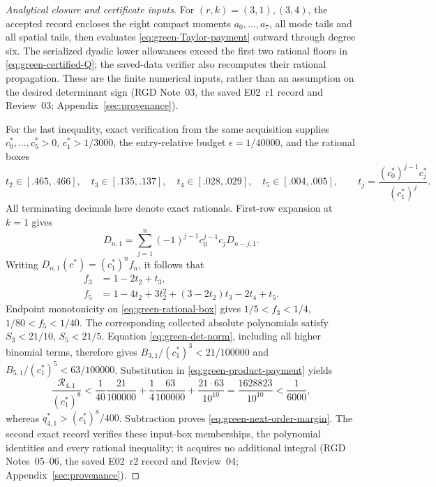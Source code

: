 \begin{proof}[Analytical closure and certificate inputs]
For \((r,k)=(3,1),(3,4)\), the accepted record encloses the eight
compact moments \(a_0,\ldots,a_7\), all mode tails and all spatial tails,
then evaluates \eqref{eq:green-Taylor-payment} outward through degree six.
The serialized dyadic lower allowances exceed the first two rational
floors in \eqref{eq:green-certified-Q}; the saved-data verifier also
recomputes their rational propagation.  These are the finite numerical
inputs, rather than an assumption on the desired determinant sign
(RGD Note~03, the saved E02~r1 record and Review~03;
Appendix~\ref{sec:provenance}).

For the last inequality, exact verification from the same acquisition
supplies \(c_0^*,\ldots,c_5^*>0\), \(c_1^*>1/3000\), the entry-relative
budget \(\epsilon=1/40000\), and the rational boxes
\begin{equation}
 t_2\in[.465,.466],\quad t_3\in[.135,.137],\quad
 t_4\in[.028,.029],\quad t_5\in[.004,.005],\qquad
 t_j=\frac{(c_0^*)^{j-1}c_j^*}{(c_1^*)^j}.
 \label{eq:green-rational-box}
\end{equation}
All terminating decimals here denote exact rationals.  First-row
expansion at \(k=1\) gives
\begin{equation}
 D_{n,1}=\sum_{j=1}^n(-1)^{j-1}c_0^{j-1}c_jD_{n-j,1}.
\end{equation}
Writing \(D_{n,1}(c^*)=(c_1^*)^nf_n\), it follows that
\begin{align}
 f_3&=1-2t_2+t_3,\\
 f_5&=1-4t_2+3t_2^2+(3-2t_2)t_3-2t_4+t_5.
\end{align}
Endpoint monotonicity on \eqref{eq:green-rational-box} gives
\(1/5<f_3<1/4\), \(1/80<f_5<1/40\).  The corresponding collected
absolute polynomials satisfy \(S_3<21/10\), \(S_5<21/5\).
Equation \eqref{eq:green-det-norm}, including all higher binomial terms,
therefore gives
\(B_{3,1}/(c_1^*)^3<21/100000\) and
\(B_{5,1}/(c_1^*)^5<63/100000\).  Substitution in
\eqref{eq:green-product-payment} yields
\begin{equation}
 \frac{\mathcal R_{4,1}}{(c_1^*)^8}
 <\frac1{40}\frac{21}{100000}
  +\frac14\frac{63}{100000}
  +\frac{21\cdot63}{10^{10}}
 =\frac{1628823}{10^{10}}<\frac1{6000},
\end{equation}
whereas \(q^*_{4,1}>(c_1^*)^8/400\).  Subtraction proves
\eqref{eq:green-next-order-margin}.  The second exact record verifies
these input-box memberships, the polynomial identities and every rational
inequality; it acquires no additional integral
(RGD Notes~05--06, the saved E02~r2 record and Review~04;
Appendix~\ref{sec:provenance}).
\end{proof}

